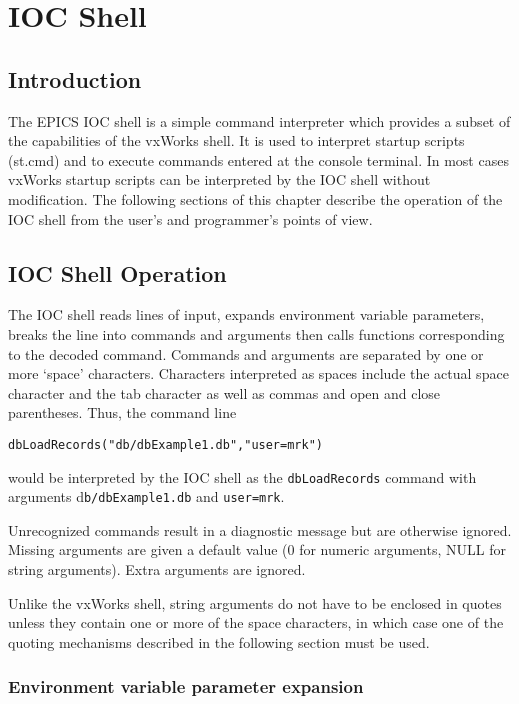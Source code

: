 \chapter{IOC Shell}
\section{Introduction}

The EPICS IOC shell is a simple command interpreter which provides a subset of the capabilities of the vxWorks shell. It 
is used to interpret startup scripts (st.cmd) and to execute commands entered at the console terminal.  In most cases 
vxWorks startup scripts can be interpreted by the IOC shell without modification. The following sections of this chapter 
describe the operation of the IOC shell from the user's and programmer's points of view.

\section{IOC Shell Operation}

The IOC shell reads lines of input, expands environment variable parameters, breaks the line into commands and 
arguments then calls functions corresponding to the decoded command. Commands and arguments are separated by one 
or more `space' characters. Characters interpreted as spaces include the actual space character and the tab character as 
well as commas and open and close parentheses. Thus, the command line

\begin{verbatim}dbLoadRecords("db/dbExample1.db","user=mrk")
\end{verbatim}would be interpreted by the IOC shell as the \verb|dbLoadRecords| command with arguments d\verb|b/dbExample1.db| and 
\verb|user=mrk|.

Unrecognized commands result in a diagnostic message but are otherwise ignored.  Missing arguments are given a default 
value (0 for numeric arguments, NULL for string arguments).  Extra arguments are ignored.

Unlike the vxWorks shell, string arguments do not have to be enclosed in quotes unless they contain one or more of the 
space characters, in which case one of the quoting mechanisms described in the following section must be used.

\subsection{Environment variable parameter expansion}


